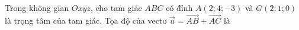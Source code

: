\begin{ex}
Trong không gian $Oxyz$, cho tam giác $ABC$ có đỉnh $A(2;4;-3)$ và $G(2;1;0)$ là trọng tâm của tam giác. Tọa độ của vectơ $\vec u=\overrightarrow{AB}+\overrightarrow{AC}$ là
\end{ex}
